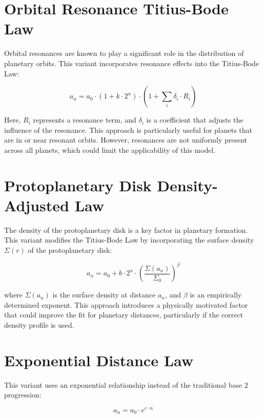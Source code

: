 \documentclass[12pt]{article}
\begin{document}
\section{Orbital Resonance Titius-Bode Law}

Orbital resonances are known to play a significant role in the distribution of planetary orbits. This variant incorporates resonance effects into the Titius-Bode Law:

\begin{equation}
a_n = a_0 \cdot (1 + k \cdot 2^n) \cdot \left(1 + \sum_i \delta_i \cdot R_i\right)
\end{equation}

Here, \(R_i\) represents a resonance term, and \(\delta_i\) is a coefficient that adjusts the influence of the resonance. This approach is particularly useful for planets that are in or near resonant orbits. However, resonances are not uniformly present across all planets, which could limit the applicability of this model.

\section{Protoplanetary Disk Density-Adjusted Law}

The density of the protoplanetary disk is a key factor in planetary formation. This variant modifies the Titius-Bode Law by incorporating the surface density \(\Sigma(r)\) of the protoplanetary disk:

\begin{equation}
a_n = a_0 + b \cdot 2^n \cdot \left(\frac{\Sigma(a_n)}{\Sigma_0}\right)^\beta
\end{equation}

where \(\Sigma(a_n)\) is the surface density at distance \(a_n\), and \(\beta\) is an empirically determined exponent. This approach introduces a physically motivated factor that could improve the fit for planetary distances, particularly if the correct density profile is used.

\section{Exponential Distance Law}

This variant uses an exponential relationship instead of the traditional base 2 progression:

\begin{equation}
a_n = a_0 \cdot e^{c \cdot n}
\end{equation}
\end{document}
